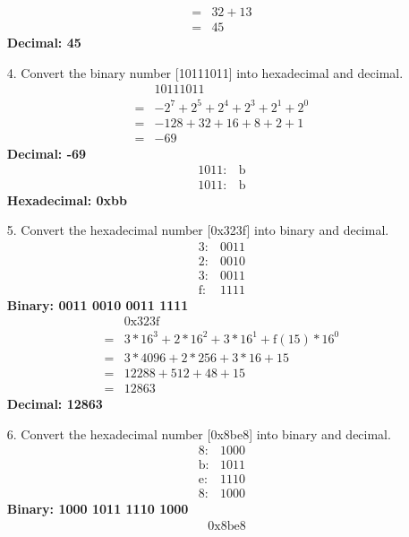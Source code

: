 \documentclass{article}
\begin{document}
\begin{itemize}
\begin{align}
        =&32+13\nonumber\\
        =&45\nonumber
    \end{align}
    \textbf{Decimal: 45}
    \item[4.] Convert the binary number [10111011] into hexadecimal and decimal.
    \begin{align}
        &10111011\nonumber\\
        =&-2^7+2^5+2^4+2^3+2^1+2^0\nonumber\\
        =&-128+32+16+8+2+1\nonumber\\
        =&-69\nonumber
    \end{align}
    \textbf{Decimal: -69}
    \begin{align}
        1011: &\text{b}\nonumber\\
        1011: &\text{b}\nonumber
    \end{align}
    \textbf{Hexadecimal: 0xbb}
    \item[5.] Convert the hexadecimal number [0x323f] into binary and decimal.
    \begin{align}
        3: &0011\nonumber\\
        2: &0010\nonumber\\
        3: &0011\nonumber\\
        \text{f}: &1111\nonumber
    \end{align}
    \textbf{Binary: 0011 0010 0011 1111}
    \begin{align}
        &0\text{x}323\text{f}\nonumber\\
        =&3*16^3+2*16^2+3*16^1+\text{f}(15)*16^0\nonumber\\
        =&3*4096+2*256+3*16+15\nonumber\\
        =&12288+512+48+15\nonumber\\
        =&12863\nonumber
    \end{align}
    \textbf{Decimal: 12863}
    \item[6.] Convert the hexadecimal number [0x8be8] into binary and decimal.
    \begin{align}
        8: &1000\nonumber\\
        \text{b}: &1011\nonumber\\
        \text{e}: &1110\nonumber\\
        8: &1000\nonumber
    \end{align}
    \textbf{Binary: 1000 1011 1110 1000}
    \begin{align}
        &0\text{x}8\text{be}8\nonumber\\

\end{align}
\end{itemize}
\end{document}
